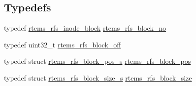 \subsection*{Typedefs}
\begin{DoxyCompactItemize}
\item 
typedef \mbox{\hyperlink{rtems-rfs-inode_8h_aa30717f37e5238a8f6387b4d0dbb2ae3}{rtems\+\_\+rfs\+\_\+inode\+\_\+block}} \mbox{\hyperlink{rtems-rfs-block-pos_8h_abbf8bb95acf9bd16ed3291f7da518e9a}{rtems\+\_\+rfs\+\_\+block\+\_\+no}}
\item 
typedef uint32\+\_\+t \mbox{\hyperlink{rtems-rfs-block-pos_8h_ad32ba1f9be3b667fe3e778d0edfdfff3}{rtems\+\_\+rfs\+\_\+block\+\_\+off}}
\item 
typedef struct \mbox{\hyperlink{structrtems__rfs__block__pos__s}{rtems\+\_\+rfs\+\_\+block\+\_\+pos\+\_\+s}} \mbox{\hyperlink{rtems-rfs-block-pos_8h_a0d8bd7482333e584a03df45e60cda226}{rtems\+\_\+rfs\+\_\+block\+\_\+pos}}
\item 
typedef struct \mbox{\hyperlink{structrtems__rfs__block__size__s}{rtems\+\_\+rfs\+\_\+block\+\_\+size\+\_\+s}} \mbox{\hyperlink{rtems-rfs-block-pos_8h_aa72438eee22908110dc633ca6b89b390}{rtems\+\_\+rfs\+\_\+block\+\_\+size}}
\end{DoxyCompactItemize}
